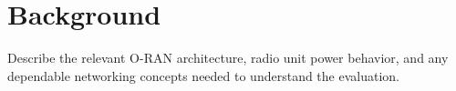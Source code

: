 \section{Background}

Describe the relevant O-RAN architecture, radio unit power behavior, and any
dependable networking concepts needed to understand the evaluation.
